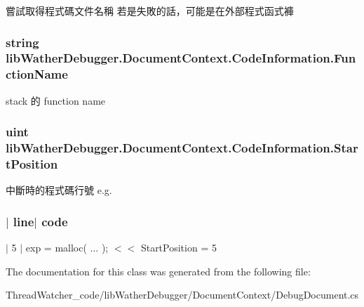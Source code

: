 嘗試取得程式碼文件名稱 若是失敗的話，可能是在外部程式函式褲 

\hypertarget{classlib_wather_debugger_1_1_document_context_1_1_code_information_a1aaf601fc22c656728294f2c5f80db3c}{
\subsubsection[{Function\+Name}]{\setlength{\rightskip}{0pt plus 5cm}string lib\+Wather\+Debugger.\+Document\+Context.\+Code\+Information.\+Function\+Name\hspace{0.3cm}{\ttfamily [get]}}}\label{classlib_wather_debugger_1_1_document_context_1_1_code_information_a1aaf601fc22c656728294f2c5f80db3c}


stack 的 function name 

\hypertarget{classlib_wather_debugger_1_1_document_context_1_1_code_information_a68ab02f74990ba0b88b32bb02410d749}{
\subsubsection[{Start\+Position}]{\setlength{\rightskip}{0pt plus 5cm}uint lib\+Wather\+Debugger.\+Document\+Context.\+Code\+Information.\+Start\+Position\hspace{0.3cm}{\ttfamily [get]}}}\label{classlib_wather_debugger_1_1_document_context_1_1_code_information_a68ab02f74990ba0b88b32bb02410d749}


中斷時的程式碼行號 e.\+g. \subsubsection*{$\vert$ line$\vert$ code }

$\vert$ 5 $\vert$ exp = malloc( ... ); $<$$<$ Start\+Position = 5 



The documentation for this class was generated from the following file\+:\begin{DoxyCompactItemize}
\item 
Thread\+Watcher\+\_\+code/lib\+Wather\+Debugger/\+Document\+Context/Debug\+Document.\+cs\end{DoxyCompactItemize}
